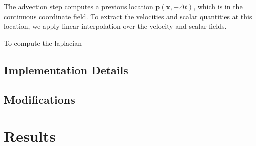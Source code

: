 \documentclass[sigconf]{acmart}
\begin{document}
The advection step computes a previous location $\mathbf{p}(\mathbf{x}, -\Delta t)$, which is in the continuous coordinate field. To extract the velocities and scalar quantities at this location, we apply linear interpolation over the velocity and scalar fields.

To compute the laplacian

\subsection{Implementation Details}

\subsection{Modifications}

\section{Results}
\label{sec:result}



\end{document}
